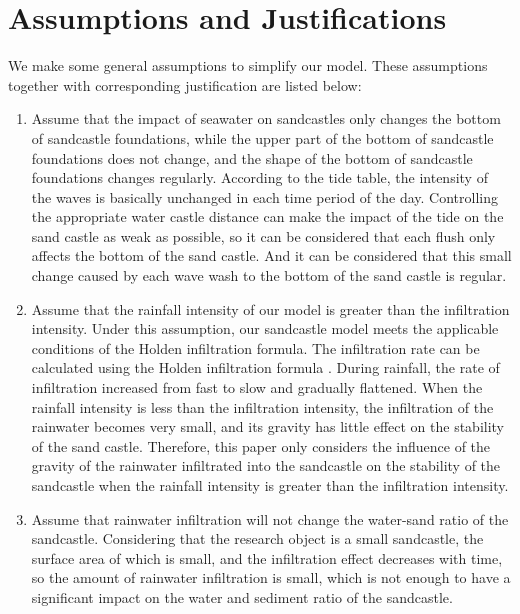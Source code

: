 \documentclass[12pt]{article}
\begin{document}
\section{Assumptions and Justifications}
We make some general assumptions to simplify our model. These assumptions together
with corresponding justification are listed below:
\begin{enumerate}
	\item Assume that the impact of seawater on sandcastles only changes the bottom of sandcastle foundations, while the upper part of the bottom of sandcastle foundations does not change, and the shape of the bottom of sandcastle foundations changes regularly.
	According to the tide table, the intensity of the waves is basically unchanged in each time period of the day. Controlling the appropriate water castle distance can make the impact of the tide on the sand castle as weak as possible, so it can be considered that each flush only affects the bottom of the sand castle. And it can be considered that this small change caused by each wave wash to the bottom of the sand castle is regular.
	\item  Assume that the rainfall intensity of our model is greater than the infiltration intensity. Under this assumption, our sandcastle model meets the applicable conditions of the Holden infiltration formula. The infiltration rate can be calculated using the Holden infiltration formula \cite{1}. During rainfall, the rate of infiltration increased from fast to slow and gradually flattened. When the rainfall intensity is less than the infiltration intensity, the infiltration of the rainwater becomes very small, and its gravity has little effect on the stability of the sand castle. Therefore, this paper only considers the influence of the gravity of the rainwater infiltrated into the sandcastle on the stability of the sandcastle when the rainfall intensity is greater than the infiltration intensity.
	\item Assume that rainwater infiltration will not change the water-sand ratio of the sandcastle. Considering that the research object is a small sandcastle, the surface area of which is small, and the infiltration effect decreases with time, so the amount of rainwater infiltration is small, which is not enough to have a significant impact on the water and sediment ratio of the sandcastle.
\end{enumerate}
\end{document}

